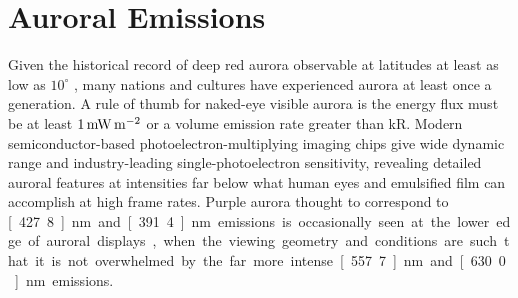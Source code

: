 \section{Auroral Emissions}\label{sec:physicsemissions}

Given the historical record of deep red aurora observable at latitudes at least as low as $10^\circ$ \citep{silverman2008}, many nations and cultures have experienced aurora at least once a generation.
A rule of thumb for naked-eye visible aurora is the energy flux must be at least $\unit[1]{mW\, m^{-2}}$ or a volume emission rate greater than \unit[1]{kR}.
Modern semiconductor-based photoelectron-multiplying imaging chips give wide dynamic range and industry-leading single-photoelectron sensitivity, revealing detailed auroral features at intensities far below what human eyes and emulsified film can accomplish at high frame rates.
Purple aurora thought to correspond to \unit[427.8]{nm} and \unit[391.4]{nm} emissions is occasionally seen at the lower edge of auroral displays, when the viewing geometry and conditions are such that it is not overwhelmed by the far more intense \unit[557.7]{nm} and \unit[630.0]{nm} emissions.

